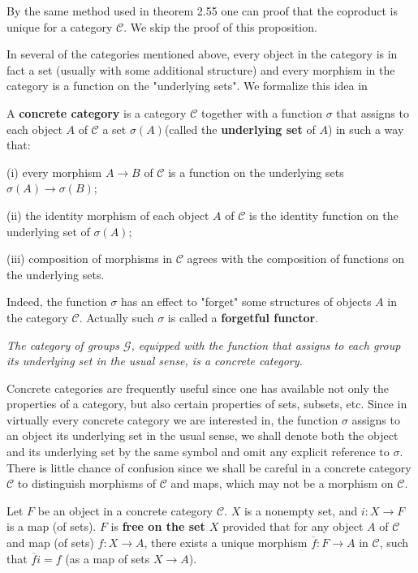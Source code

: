 By the same method used in theorem 2.55 one can proof that the coproduct is unique for a category $\mathcal{C}$. We skip the proof of this proposition.\par
In several of the categories mentioned above, every object in the category is in fact a set (usually with some additional structure) and every morphism in the category is a function on the "underlying sets". We formalize this idea in
\begin{definition}
A \textbf{concrete category} is a category $\mathcal{C}$ together with a function $\sigma$ that assigns to each object $A$ of $\mathcal{C}$ a set $\sigma(A)$(called the \textbf{underlying set} of $A$) in such a way that:\par
(i) every morphism $A\to B$ of $\mathcal{C}$ is a function on the underlying sets $\sigma(A)\to\sigma(B)$;\par
(ii) the identity morphism of each object $A$ of $\mathcal{C}$ is the identity function on the underlying set of $\sigma(A)$;\par
(iii) composition of morphisms in $\mathcal{C}$ agrees with the composition of functions on the underlying sets.
\end{definition}
Indeed, the function $\sigma$ has an effect to "forget" some structures of objects $A$ in the category $\mathcal{C}$. Actually such $\sigma$ is called a \textbf{forgetful functor}.\par
\begin{example}\em
The category of groups $\mathcal{G}$, equipped with the function that assigns to each group its underlying set in the usual sense, is a concrete category.
\end{example}
Concrete categories are frequently useful since one has available not only the properties of a category, but also certain properties of sets, subsets, etc. Since in virtually every concrete category we are interested in, the function $\sigma$ assigns to an object its underlying set in the usual sense, we shall denote both the object and its underlying set by the same symbol and omit any explicit reference to $\sigma$. There is little chance of confusion since we shall be careful in a concrete category $\mathcal{C}$ to distinguish morphisms of $\mathcal{C}$ and maps, which may not be a morphism on $\mathcal{C}$.
\begin{definition}
Let $F$ be an object in a concrete category $\mathcal{C}$. $X$ is a nonempty set, and $i:X\to F$ is a map (of sets). $F$ is \textbf{free on the set $X$} provided that for any object $A$ of $\mathcal{C}$ and map (of sets) $f:X\to A$, there exists a unique morphism $\overline{f}:F\to A$ in $\mathcal{C}$, such that $\overline{f}i=f$ (as a map of sets $X\to A$).
\end{definition}

